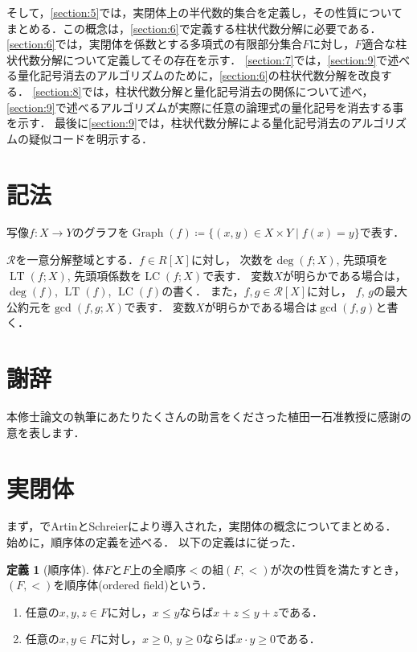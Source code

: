 \documentclass[uplatex, dvipdfmx]{jsarticle}
\numberwithin{equation}{section}
\newcommand{\map}[3]{{#1}\colon{#2}\rightarrow{#3}}
\DeclareMathOperator{\LT}{LT}
\DeclareMathOperator{\LC}{LC}
\DeclareMathOperator{\Graph}{Graph}
\theoremstyle{definition}
\newtheorem{definition}{定義}[section]
\begin{document}
     そして，\cref{section:5}では，実閉体上の半代数的集合を定義し，その性質についてまとめる．この概念は，\cref{section:6}で定義する柱状代数分解に必要である．
     \cref{section:6}では，実閉体を係数とする多項式の有限部分集合$F$に対し，$F$適合な柱状代数分解について定義してその存在を示す．
     \cref{section:7}では，\cref{section:9}で述べる量化記号消去のアルゴリズムのために，\cref{section:6}の柱状代数分解を改良する．
     \cref{section:8}では，柱状代数分解と量化記号消去の関係について述べ，
     \cref{section:9}で述べるアルゴリズムが実際に任意の論理式の量化記号を消去する事を示す．
     最後に\cref{section:9}では，柱状代数分解による量化記号消去のアルゴリズムの疑似コードを明示する．

     \section*{記法}
     写像$\map{f}{X}{Y}$のグラフを$\Graph(f) \coloneqq \{(x,y) \in X \times Y \mid f(x) = y\}$で表す．

     $\mathcal{R}$を一意分解整域とする．$f \in R[X]$に対し，
     次数を$\deg(f;X)$, 先頭項を$\LT(f;X)$, 先頭項係数を$\LC(f;X)$で表す．
     変数$X$が明らかである場合は，$\deg(f)$, $\LT(f)$, $\LC(f)$の書く．
     また，$f, g \in \mathcal{R}[X]$に対し，
     $f$, $g$の最大公約元を$\gcd(f,g;X)$で表す．
     変数$X$が明らかである場合は$\gcd(f,g)$と書く．

     \section*{謝辞}
     本修士論文の執筆にあたりたくさんの助言をくださった植田一石准教授に感謝の意を表します．

\section{実閉体}\label{section:2}

まず，\cite{MR3069467}でArtinとSchreierにより導入された，実閉体の概念についてまとめる．
始めに，順序体の定義を述べる．
以下の定義は\cite[Definition 1.1.1]{MR1659509}に従った．

\begin{definition}[順序体]
     体$F$と$F$上の全順序$<$の組$(F,<)$が次の性質を満たすとき，$(F,<)$を順序体(ordered field)という．
     \begin{enumerate}
          \item 任意の$x,y,z\in F$に対し，$x \leq y$ならば$x + z \leq y + z$である．
          \item 任意の$x,y \in F$に対し，$x \geq 0$, $y \geq 0$ならば$x \cdot y \geq 0$である．
     \end{enumerate}
\end{definition}
\end{document}
